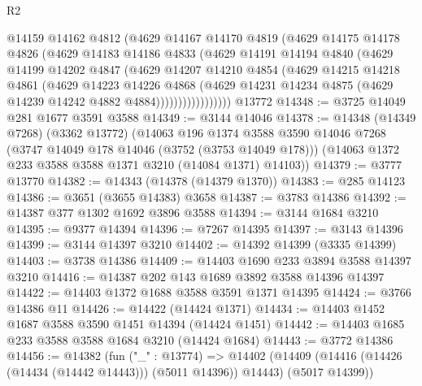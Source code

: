 \begin{lexlean}{R2}
\begin{coremodule}
                  @14159
                  @14162
                  @4812
                  (@4629
                    @14167
                    @14170
                    @4819
                    (@4629
                      @14175
                      @14178
                      @4826
                      (@4629
                        @14183
                        @14186
                        @4833
                        (@4629
                          @14191
                          @14194
                          @4840
                          (@4629
                            @14199
                            @14202
                            @4847
                            (@4629
                              @14207
                              @14210
                              @4854
                              (@4629
                                @14215
                                @14218
                                @4861
                                (@4629
                                  @14223
                                  @14226
                                  @4868
                                  (@4629
                                    @14231
                                    @14234
                                    @4875
                                    (@4629 @14239 @14242 @4882 @4884)))))))))))))))))
    @13772
@14348 := @3725 @14049 @281 @1677 @3591 @3588
@14349 := @3144 @14046
@14378 := @14348
    (@14349 @7268)
    (@3362 @13772)
    (@14063
      @196
      @1374
      @3588
      @3590
      @14046
      @7268
      (@3747 @14049 @178 @14046 (@3752 (@3753 @14049 @178)))
      (@14063 @1372 @233 @3588 @3588 @1371 @3210 (@14084 @1371) @14103))
@14379 := @3777 @13770
@14382 := @14343 (@14378 (@14379 @1370))
@14383 := @285 @14123
@14386 := @3651 (@3655 @14383) @3658
@14387 := @3783 @14386
@14392 := @14387 @377 @1302 @1692 @3896 @3588
@14394 := @3144 @1684 @3210
@14395 := @9377 @14394
@14396 := @7267 @14395
@14397 := @3143 @14396
@14399 := @3144 @14397 @3210
@14402 := @14392 @14399 (@3335 @14399)
@14403 := @3738 @14386
@14409 := @14403 @1690 @233 @3894 @3588 @14397 @3210
@14416 := @14387 @202 @143 @1689 @3892 @3588 @14396 @14397
@14422 := @14403 @1372 @1688 @3588 @3591 @1371 @14395
@14424 := @3766 @14386 @11
@14426 := @14422 (@14424 @1371)
@14434 := @14403 @1452 @1687 @3588 @3590 @1451 @14394 (@14424 @1451)
@14442 := @14403 @1685 @233 @3588 @3588 @1684 @3210 (@14424 @1684)
@14443 := @3772 @14386
@14456 := @14382
    (fun ("_" : @13774) =>
    @14402 (@14409 (@14416 (@14426 (@14434 (@14442 @14443))) (@5011 @14396)) @14443) (@5017 @14399))

\end{coremodule}
\end{lexlean}
